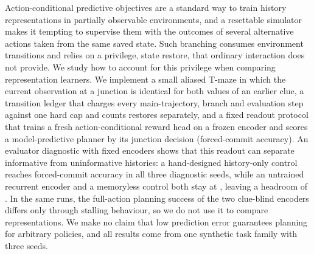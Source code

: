 Action-conditional predictive objectives are a standard way to train history representations in partially observable environments, and a resettable simulator makes it tempting to supervise them with the outcomes of several alternative actions taken from the same saved state. Such branching consumes environment transitions and relies on a privilege, state restore, that ordinary interaction does not provide. We study how to account for this privilege when comparing representation learners. We implement a small aliased T-maze in which the current observation at a junction is identical for both values of an earlier clue, a transition ledger that charges every main-trajectory, branch and evaluation step against one hard cap and counts restores separately, and a fixed readout protocol that trains a fresh action-conditional reward head on a frozen encoder and scores a model-predictive planner by its junction decision (forced-commit accuracy). An evaluator diagnostic with fixed encoders shows that this readout can separate informative from uninformative histories: a hand-designed history-only control reaches forced-commit accuracy \DiagForcedInfoMin{} in all three diagnostic seeds, while an untrained recurrent encoder and a memoryless control both stay at \DiagForcedRandMax{}, leaving a headroom of \DiagHeadroomMin{}. In the same runs, the full-action planning success of the two clue-blind encoders differs only through stalling behaviour, so we do not use it to compare representations. We make no claim that low prediction error guarantees planning for arbitrary policies, and all results come from one synthetic task family with three seeds.
